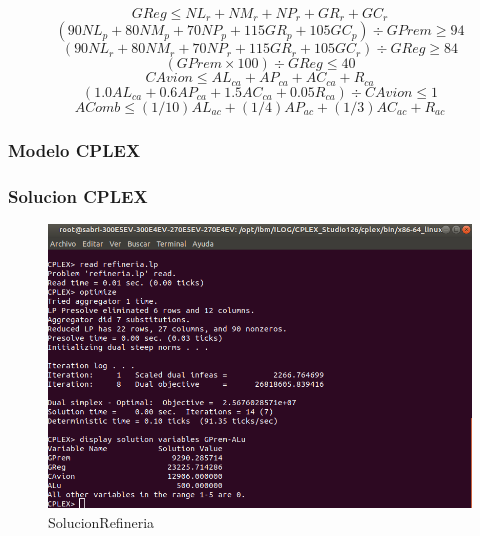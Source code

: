 \begin{equation}
GReg \leq NL_{r}+NM_{r}+NP_{r}+GR_{r}+GC_{r}
\end{equation}
\begin{equation}
(90NL_{p}+80NM_{p}+70NP_{p}+115GR_{p}+105GC_{p}) \div GPrem \geq 94 
\end{equation}
\begin{equation}
(90NL_{r}+80NM_{r}+70NP_{r}+115GR_{r}+105GC_{r}) \div GReg \geq 84 
\end{equation}
\begin{equation}
(GPrem \times 100) \div GReg \leq 40 
\end{equation}
\begin{equation}
CAvion \leq AL_{ca}+AP_{ca}+ AC_{ca}+ R_{ca}
\end{equation}
\begin{equation}
(1.0AL_{ca}+0.6AP_{ca}+1.5AC_{ca}+0.05R_{ca}) \div CAvion \leq 1 
\end{equation}
\begin{equation}
AComb \leq (1/10)AL_{ac}+(1/4)AP_{ac}+ (1/3)AC_{ac}+ R_{ac}
\end{equation}

\subsubsection{Modelo CPLEX}

\subsubsection{Solucion CPLEX}
\begin{figure}[!h]
    \centering
    \includegraphics[scale=0.4]{modelos/SolutionRefineria.png}
    \caption{SolucionRefineria}
\end{figure}

